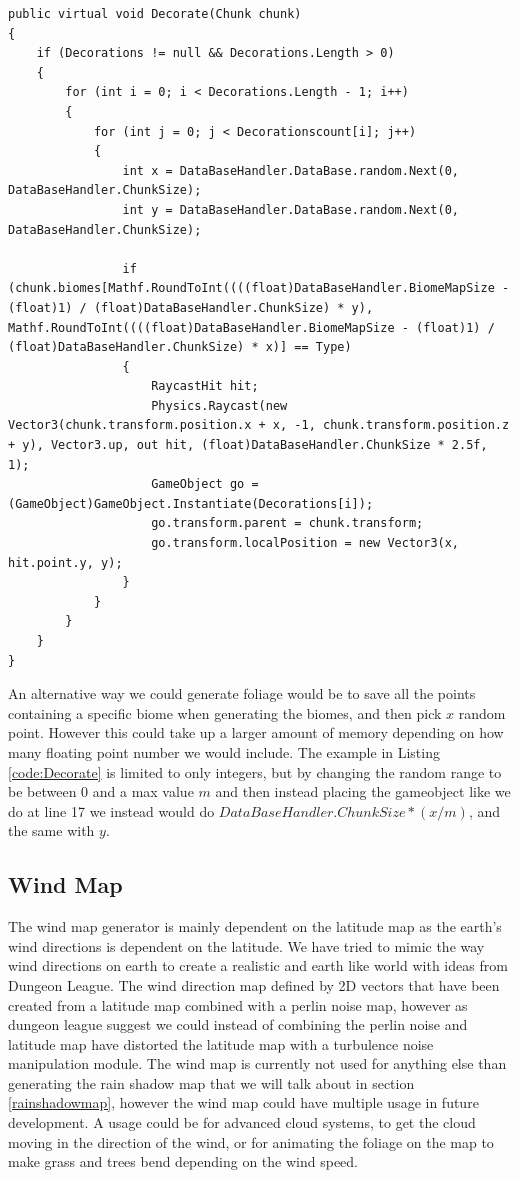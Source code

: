 \begin{lstlisting}[caption = The decorate function in the Biome class., label=code:Decorate, language=Csharp]
public virtual void Decorate(Chunk chunk)
{
	if (Decorations != null && Decorations.Length > 0)
	{
		for (int i = 0; i < Decorations.Length - 1; i++)
		{
			for (int j = 0; j < Decorationscount[i]; j++)
			{
				int x = DataBaseHandler.DataBase.random.Next(0, DataBaseHandler.ChunkSize);
				int y = DataBaseHandler.DataBase.random.Next(0, DataBaseHandler.ChunkSize);
				
				if (chunk.biomes[Mathf.RoundToInt((((float)DataBaseHandler.BiomeMapSize - (float)1) / (float)DataBaseHandler.ChunkSize) * y), 	Mathf.RoundToInt((((float)DataBaseHandler.BiomeMapSize - (float)1) / (float)DataBaseHandler.ChunkSize) * x)] == Type)
				{
					RaycastHit hit;
					Physics.Raycast(new Vector3(chunk.transform.position.x + x, -1, chunk.transform.position.z + y), Vector3.up, out hit, (float)DataBaseHandler.ChunkSize * 2.5f, 1);
					GameObject go = (GameObject)GameObject.Instantiate(Decorations[i]);
					go.transform.parent = chunk.transform;
					go.transform.localPosition = new Vector3(x, hit.point.y, y);
				}
			}
		}
	}
}
\end{lstlisting}

An alternative way we could generate foliage would be to save all the points containing a specific biome when generating the biomes, and then pick $x$ random point. However this could take up a larger amount of memory depending on how many floating point number we would include. The example in Listing \ref{code:Decorate} is limited to only integers, but by changing the random range to be between 0 and a max value $m$ and then instead placing the gameobject like we do at line 17 we instead would do $DataBaseHandler.ChunkSize * (x / m)$, and the same with $y$.


\subsection{Wind Map}
\label{windmap}

The wind map generator is mainly dependent on the latitude map as the earth's wind directions is dependent on the latitude. We have tried to mimic the way wind directions on earth to create a realistic and earth like world with ideas from Dungeon League\cite{WindMap}. The wind direction map defined by 2D vectors that have been created from a latitude map combined with a perlin noise map, however as dungeon league suggest we could instead of combining the perlin noise and latitude map have distorted the latitude map with a turbulence noise manipulation module. The wind map is currently not used for anything else than generating the rain shadow map that we will talk about in section \ref{rainshadowmap}, however the wind map could have multiple usage in future development. A usage could be for advanced cloud systems, to get the cloud moving in the direction of the wind, or for animating the foliage on the map to make grass and trees bend depending on the wind speed.


